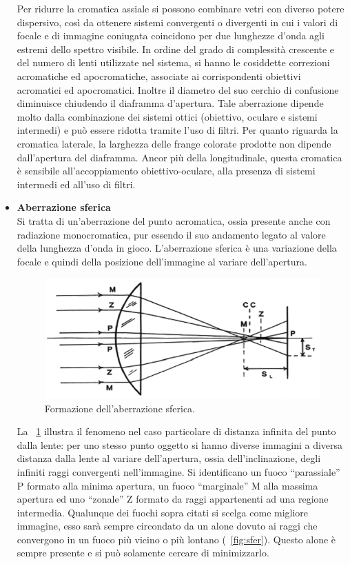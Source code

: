 \begin{itemize}
Per ridurre la cromatica assiale si possono combinare vetri con diverso potere dispersivo, così da ottenere sistemi convergenti o divergenti in cui i valori di focale e di immagine coniugata coincidono per due lunghezze d'onda agli estremi dello spettro visibile. 
In ordine del grado di complessità crescente e del numero di lenti utilizzate nel sistema, si hanno le cosiddette correzioni acromatiche ed apocromatiche, associate ai corrispondenti obiettivi acromatici ed apocromatici. 
Inoltre il diametro del suo cerchio di confusione diminuisce chiudendo il diaframma d'apertura. 
Tale aberrazione dipende molto dalla combinazione dei sistemi ottici (obiettivo, oculare e sistemi intermedi) e può essere ridotta tramite l'uso di filtri. 
Per quanto riguarda la cromatica laterale, la larghezza delle frange colorate prodotte non dipende dall'apertura del diaframma.
Ancor più della longitudinale, questa cromatica è sensibile all'accoppiamento obiettivo-oculare, alla presenza di sistemi intermedi ed all'uso di filtri.

\item \textbf{Aberrazione sferica}\\
Si tratta di un'aberrazione del punto acromatica, ossia presente anche con radiazione monocromatica, pur essendo il suo andamento legato al valore della lunghezza d'onda in gioco.
L'aberrazione sferica è una variazione della focale e quindi della posizione dell'immagine al variare dell'apertura. 

\begin{figure}
 \centering
 \includegraphics[scale=.35]{img/CAP2as.png}
 \caption{\small{Formazione dell'aberrazione sferica.}}
 \label{fig:as}
\end{figure}

La \figurename~\ref{fig:as} illustra il fenomeno nel caso particolare di distanza infinita del punto dalla lente: per uno stesso punto oggetto si hanno diverse immagini a diversa distanza dalla lente al variare dell'apertura, ossia dell'inclinazione, degli infiniti raggi convergenti nell'immagine.
Si identificano un fuoco ``parassiale'' P formato alla minima apertura, un fuoco ``marginale'' M alla massima apertura ed uno ``zonale'' Z formato da raggi appartenenti ad una regione intermedia.
Qualunque dei fuochi sopra citati si scelga come migliore immagine, esso sarà sempre circondato da un alone dovuto ai raggi che convergono in un fuoco più vicino o più lontano (\figurename~\ref{fig:sfer}). Questo alone è sempre presente e si può solamente cercare di minimizzarlo. 


\end{itemize}
